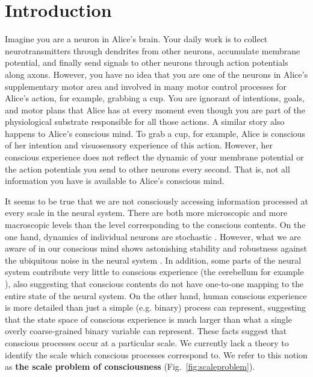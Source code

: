 \documentclass[utf8]{article}
\begin{document}
    \newpage
	\section{Introduction}

		Imagine you are a neuron in Alice's brain. Your daily work is to collect neurotransmitters through dendrites from other neurons, accumulate membrane potential, and finally send signals to other neurons through action potentials along axons. However, you have no idea that you are one of the neurons in Alice's supplementary motor area and involved in many motor control processes for Alice's action, for example, grabbing a cup. You are ignorant of intentions, goals, and motor plans that Alice has at every moment even though you are part of the physiological substrate responsible for all those actions.
		A similar story also happens to Alice's conscious mind. To grab a cup, for example, Alice is conscious of her intention and visuosensory experience of this action. However, her conscious experience does not reflect the dynamic of your membrane potential or the action potentials you send to other neurons every second. That is, not all information you have is available to Alice's conscious mind.

		
		It seems to be true that we are not consciously accessing information processed at every scale in the neural system. There are both more microscopic and more macroscopic levels than the level corresponding to the conscious contents. On the one hand, dynamics of individual neurons are stochastic \citep{Goldwyn2011, White2000}. However, what we are aware of in our conscious mind shows astonishing stability and robustness against the ubiquitous noise in the neural system \citep{mathis1995computational}. In addition, some parts of the neural system contribute very little to conscious experience (the cerebellum for example \citep{lemon2010life}), also suggesting that conscious contents do not have one-to-one mapping to the entire state of the neural system. On the other hand, human conscious experience is more detailed than just a simple (e.g. binary) process can represent, suggesting that the state space of conscious experience is much larger than what a single overly coarse-grained binary variable can represent. These facts suggest that conscious processes occur at a particular scale. We currently lack a theory to identify the scale which conscious processes correspond to. We refer to this notion as \textbf{the scale problem of consciousness} (Fig.~\ref{fig:scaleproblem}).
\end{document}
